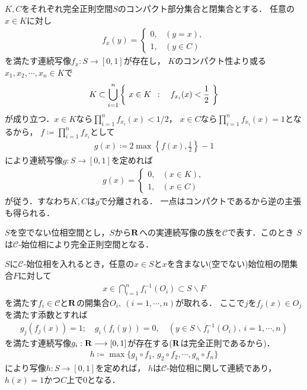 	\begin{prf}
		$K,C$をそれぞれ完全正則空間$S$のコンパクト部分集合と閉集合とする．
		任意の$x \in K$に対し
		\begin{align}
			f_x(y) = 
			\begin{cases}
				0, & (y=x), \\
				1, & (y \in C)
			\end{cases} 
		\end{align}
		を満たす連続写像$f_x:S \longrightarrow [0,1]$が存在し，
		$K$のコンパクト性より或る$x_1,x_2,\cdots,x_n \in K$で
		\begin{align}
			K \subset \bigcup_{i=1}^n \left\{\ x \in K\ \, : \quad f_{x_i}(x) < \frac{1}{2}\ \right\}
		\end{align}
		が成り立つ．$x \in K$なら$\prod_{i=1}^n f_{x_i}(x) < 1/2$，
		$x \in C$なら$\prod_{i=1}^n f_{x_i}(x) = 1$となるから，
		$f \coloneqq \prod_{i=1}^n f_{x_i}$として
		\begin{align}
			g(x) \coloneqq 2 \operatorname{max}\left\{f(x),\frac{1}{2}\right\} - 1
		\end{align}
		により連続写像$g:S \longrightarrow [0,1]$を定めれば
		\begin{align}
			g(x) = 
			\begin{cases}
				0, & (x \in K), \\
				1, & (x \in C)
			\end{cases}
		\end{align}
		が従う．すなわち$K,C$は$g$で分離される．
		一点はコンパクトであるから逆の主張も得られる．
		\QED
	\end{prf}
	
	\begin{screen}
		\begin{thm}[実連続写像の族が生成する始位相は完全正則]
		\label{thm:initial_topology_of_continuous_functions_is_completely_regular}
			$S$を空でない位相空間とし，$S$から$\mathbf{R}$への実連続写像の族を$\mathscr{C}$で表す．このとき
			$S$は$\mathscr{C}$-始位相により完全正則空間となる．
		\end{thm}
	\end{screen}
	
	\begin{prf}
		$S$に$\mathscr{C}$-始位相を入れるとき，任意の$x \in S$と$x$を含まない(空でない)始位相の閉集合$F$に対して
		\begin{align}
			x \in \bigcap_{i=1}^n f_i^{-1}(O_i) \subset S \backslash F
		\end{align}
		を満たす$f_i \in \mathscr{C}$と$\mathbf{R}$の開集合$O_i,\ (i=1,\cdots,n)$が取れる．
		ここで$j$を$f_j(x) \in O_j$を満たす添数とすれば
		\begin{align}
			g_j(f_j(x)) = 1;\quad g_i(f_i(y)) = 0,\quad (y \in S \backslash f_i^{-1}(O_i),
			\ i=1,\cdots,n)
		\end{align}
		を満たす連続写像$g_i:\mathbf{R} \longrightarrow [0,1]$が存在する($\mathbf{R}$は完全正則であるから)．
		\begin{align}
			h \coloneqq \operatorname{max}\{g_1 \circ f_1,\, g_2 \circ f_2,\cdots,g_n \circ f_n\}
		\end{align}
		により写像$h:S \longrightarrow [0,1]$を定めれば，
		$h$は$\mathscr{C}$-始位相に関して連続であり，
		$h(x)=1$かつ$C$上で$0$となる．
		\QED
	\end{prf}
	
